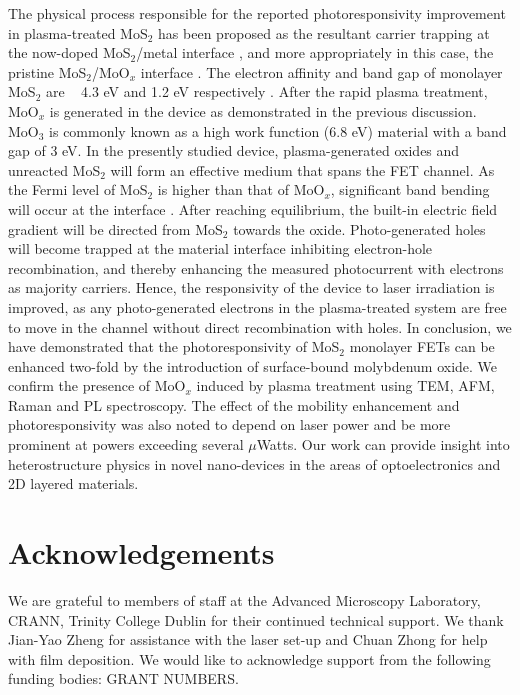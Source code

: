 \documentclass[%
 reprint,
superscriptaddress,
 amsmath,amssymb,
 aps,
prb,
]{revtex4-1}
\begin{document}
\twocolumngrid

\indent The physical process responsible for the reported photoresponsivity improvement in plasma-treated MoS$_2$ has been proposed as the resultant carrier trapping at the now-doped MoS$_2$/metal interface \cite{wi2014enhancement}, and more appropriately in this case, the pristine MoS$_2$/MoO$_x$ interface \cite{Yoo2017}.
The electron affinity and band gap of monolayer MoS$_2$ are ~ 4.3 eV and 1.2 eV respectively \cite{Liang2013,Mak2010a}. After the rapid plasma treatment, MoO$_x$ is generated in the device as demonstrated in the previous discussion. MoO$_3$ is commonly known as a high work function (6.8 eV) material with a band gap of 3 eV.\cite{Kang2014, Yoo2017} In the presently studied device, plasma-generated oxides and unreacted MoS$_2$ will form an effective medium that spans the FET channel. As the Fermi level of MoS$_2$ is higher than that of MoO$_x$, significant band bending will occur at the interface \cite{Yoo2017}. After reaching equilibrium, the built-in electric field gradient will be directed from MoS$_2$ towards the oxide. Photo-generated holes will become trapped at the material interface inhibiting electron-hole recombination, and thereby enhancing the measured
photocurrent with electrons as majority carriers. Hence, the responsivity of the device to laser irradiation is improved, as any photo-generated electrons in the plasma-treated system are free to move in the channel without direct recombination with holes. \newline
\indent In conclusion, we have demonstrated that the photoresponsivity of MoS$_2$ monolayer FETs can be enhanced two-fold by the introduction of surface-bound molybdenum oxide. We confirm the presence of MoO$_x$ induced by plasma treatment using TEM, AFM, Raman and PL spectroscopy. The effect of the mobility enhancement and photoresponsivity was also noted to depend on laser power and be more prominent at powers exceeding several $\mu$Watts. Our work can provide insight into heterostructure physics in novel nano-devices in the areas of optoelectronics and 2D layered materials.





\section*{Acknowledgements}

We are grateful to members of staff at the Advanced Microscopy Laboratory, CRANN, Trinity College Dublin for their continued technical support. We thank Jian-Yao Zheng for assistance with the laser set-up and Chuan Zhong for help with film deposition. We would like to acknowledge support from the following funding bodies: GRANT NUMBERS.





\end{document}
